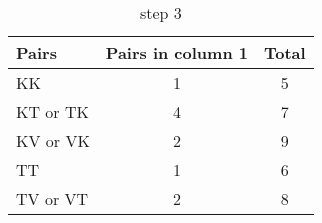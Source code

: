 \documentclass[11pt]{article}
\begin{document}
\begin{table}[ht]
	\caption{step 3}
	\label{tab:tablename2}
	\centering

	\begin{tabular}{l|c|c}
	\hline
		\textbf{Pairs} & \textbf{Pairs in column 1} & \textbf{Total} \\
	\hline
		KK & 1 & 5\\
		KT or TK & 4 & 7\\
		KV or VK & 2 & 9\\
		TT & 1 & 6\\
		TV or VT & 2 &  8 \\
	\hline

	\hline
	\end{tabular}
\end{table}

\end{document}
